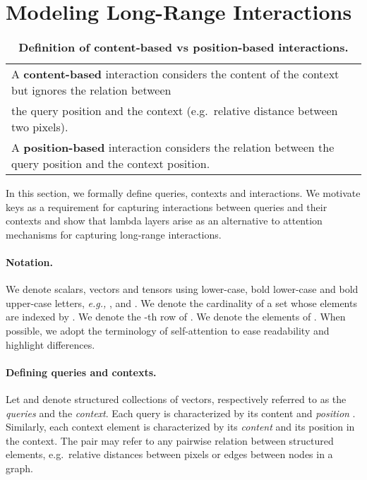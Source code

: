 \documentclass{article} \usepackage{iclr2021_conference,times}
\begin{document}
 \section{Modeling Long-Range Interactions\label{sec:preliminaries}}
\begin{table}[t]
  \begin{center}
  \small
  \begin{tabular}{l}
  \toprule
  A \textbf{content-based} interaction considers the content of the context but ignores the relation between \\
  the query position and the context (e.g.\ relative distance between two pixels). \\
  A \textbf{position-based} interaction considers the relation between the query position and the context position. \\
  \bottomrule
  \end{tabular}
  \caption{\textbf{Definition of content-based vs position-based interactions.}
  }
  \label{tab:content_position_interactions}
  \vspace{-0.4cm}
  \end{center}
\end{table}

In this section, we formally define queries, contexts and interactions.
We motivate keys as a requirement for capturing interactions between queries and their contexts and show that lambda layers arise as an alternative to attention mechanisms for capturing long-range interactions.

\vspace{-0.1cm}
\paragraph{Notation.} 
We denote scalars, vectors and tensors using lower-case, bold lower-case and bold upper-case letters, \textit{e.g.,} ,  and . 
We denote  the cardinality of a set whose elements are indexed by .
We denote  the -th row of .
We denote  the  elements of .
When possible, we adopt the terminology of self-attention to ease readability and highlight differences.

\vspace{-0.1cm}
\paragraph{Defining queries and contexts.}
Let  and  denote structured collections of vectors, respectively referred to as the \emph{queries} and the \emph{context}.
Each query  is characterized by its content  and \emph{position} .
Similarly, each context element  is characterized by its \emph{content}  
and its position  in the context.
The  pair may refer to any pairwise relation between structured elements, e.g.\ relative distances between pixels or edges between nodes in a graph.
\end{document}
